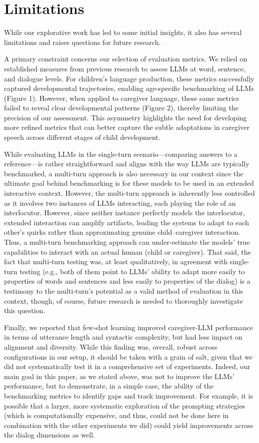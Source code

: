 \section{Limitations}

While our explorative work has led to some initial insights, it also has several limitations and raises questions for future research.

A primary constraint concerns our selection of evaluation metrics. We relied on established measures from previous research to assess LLMs at word, sentence, and dialogue levels. For children's language production, these metrics successfully captured developmental trajectories, enabling age-specific benchmarking of LLMs (Figure 1). However, when applied to caregiver language, these same metrics failed to reveal clear developmental patterns (Figure 2), thereby limiting the precision of our assessment. This asymmetry highlights the need for developing more refined metrics that can better capture the subtle adaptations in caregiver speech across different stages of child development. 

While evaluating LLMs in the single-turn scenario---comparing answers to a reference---is rather straightforward and aligns with the way LLMs are typically benchmarked, a multi-turn approach is also necessary in our context since the ultimate goal behind benchmarking is for these models to be used in an extended interactive context. However, the multi-turn approach is inherently less controlled as it involves two instances of LLMs interacting, each playing the role of an interlocutor. However, since neither instance perfectly models the interlocutor, extended interaction can amplify artifacts, leading the systems to adapt to each other’s quirks rather than approximating genuine child–caregiver interaction. Thus, a multi-turn benchmarking approach can under-estimate the models' true capabilities to interact with an actual human (child or caregiver). That said, the fact that multi-turn testing was, at least qualitatively, in agreement with single-turn testing (e.g., both of them point to LLMs' ability to adapt more easily to properties of words and sentences and less easily to properties of the dialog) is a testimony to the multi-turn's potential as a valid method of evaluation in this context, though, of course, future research is needed to thoroughly investigate this question.

Finally, we reported that few-shot learning improved caregiver-LLM performance in terms of utterance length and syntactic complexity, but had less impact on alignment and diversity. While this finding was, overall, robust across configurations in our setup, it should be taken with a grain of salt, given that we did not systematically test it in a comprehensive set of experiments. Indeed, our main goal in this paper, as we stated above, was not to improve the LLMs' performance, but to demonstrate, in a simple case, the ability of the benchmarking metrics to identify gaps and track improvement. For example, it is possible that a larger, more systematic exploration of the prompting strategies (which is computationally expensive, and thus, could not be done here in combination with the other experiments we did) could yield improvements across the dialog dimensions as well.


